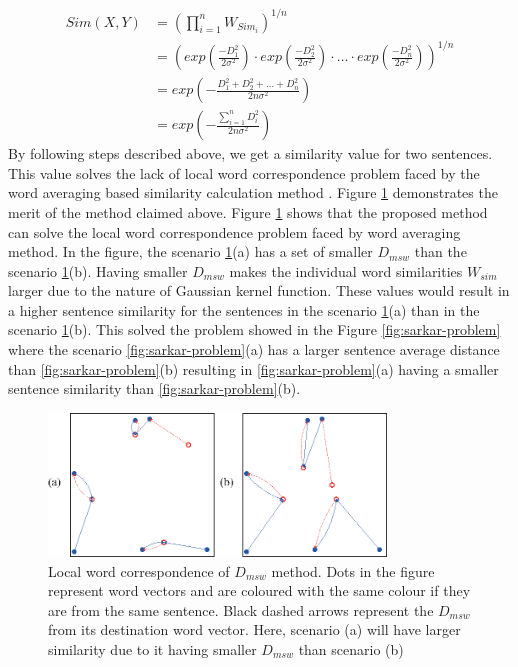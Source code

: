 \documentclass[acmlarge]{acmart}
\begin{document}
\begin{equation}\label{eq:sent_sim}
	\begin{split}
		Sim(X,Y)
		&=  \left(
			\prod_{i=1}^nW_{Sim_i}
		\right)^{1/n}\\
		&=  \left(
			exp\left(\frac{-D_1^2}{2\sigma^2}\right)\cdot
			exp\left(\frac{-D_2^2}{2\sigma^2}\right)\cdot
				\ldots \cdot
			exp\left(\frac{-D_n^2}{2\sigma^2}\right)
		\right)^{1/n}\\
		&=  exp\left(
			-\frac{D_1^2+D_2^2+\ldots+D_n^2}{2n\sigma^2}
			\right)\\
		&=  exp\left(
			-\frac{\sum_{i=1}^nD_i^2}{2n\sigma^2}
		\right)
	\end{split}
\end{equation}
By following steps described above, we get a similarity value for two sentences. This value solves the lack of local word correspondence problem faced by the word averaging based similarity calculation method \cite{roychowdhury-etal-2022-spectral-base}. Figure \ref{fig:msd} demonstrates the merit of the method claimed above. Figure \ref{fig:msd} 
shows that the proposed method can solve the local word correspondence problem faced by word averaging method. In the figure, the scenario \ref{fig:msd}(a) has a set of smaller $D_{msw}$ than the scenario \ref{fig:msd}(b). Having smaller $D_{msw}$ makes the individual word similarities $W_{sim}$ larger due to the nature of Gaussian kernel function. These values would result in a higher sentence similarity for the sentences in the scenario \ref{fig:msd}(a) than in the scenario \ref{fig:msd}(b). This solved the problem showed in the Figure \ref{fig:sarkar-problem} where the scenario \ref{fig:sarkar-problem}(a) has a larger sentence average distance than \ref{fig:sarkar-problem}(b) resulting in \ref{fig:sarkar-problem}(a) having a smaller sentence similarity than \ref{fig:sarkar-problem}(b).

\begin{figure}
	\centering
	\includegraphics[width=0.8\textwidth]{figs/msd-edited}
	\caption{Local word correspondence of $D_{msw}$ method. Dots in the figure represent word vectors and are coloured with the same colour if they are from the same sentence. Black dashed arrows represent the $D_{msw}$ from its destination word vector. Here, scenario (a) will have larger similarity due to it having smaller $D_{msw}$ than scenario (b)}
	\label{fig:msd}
\end{figure}
\end{document}
